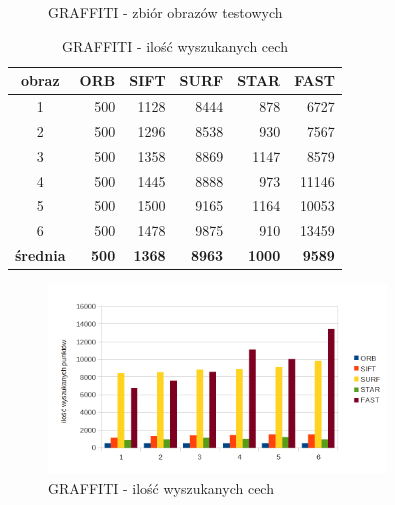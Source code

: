 \begin{figure}[!htb]
\begin{center}
{}
\caption{GRAFFITI - zbiór obrazów testowych}
\label{fig:graffiti_set}
\end{center}
\end{figure}
\FloatBarrier


\begin{table}[htbp]
  \centering
  \caption{GRAFFITI - ilość wyszukanych cech}
    \begin{tabular}{|c|r|r|r|r|r|}\hline
    
    obraz & \textbf{ORB} & \textbf{SIFT} & \textbf{SURF} & \textbf{STAR} & \textbf{FAST} \\\hline
    
   
    1 & 500 & 1128 & 8444 & 878 & 6727 \\
    2 & 500 & 1296 & 8538 & 930 & 7567 \\
    3 & 500 & 1358 & 8869 & 1147 & 8579 \\
    4 & 500 & 1445 & 8888 & 973 & 11146 \\
    5 & 500 & 1500 & 9165 & 1164 & 10053 \\
    6 & 500 & 1478 & 9875 & 910 & 13459 \\\hline
    \textbf{średnia} & \textbf{500} & \textbf{1368} & \textbf{8963} & \textbf{1000} & \textbf{9589} \\
    \hline
    \end{tabular}%
  \label{tab:graffiti_f1}%
\end{table}%


\begin{figure}
\centering
\includegraphics[width=0.8\textwidth]{pict/mikolajczyk/graff/F1.png}
\caption{GRAFFITI - ilość wyszukanych cech}
\end{figure}



